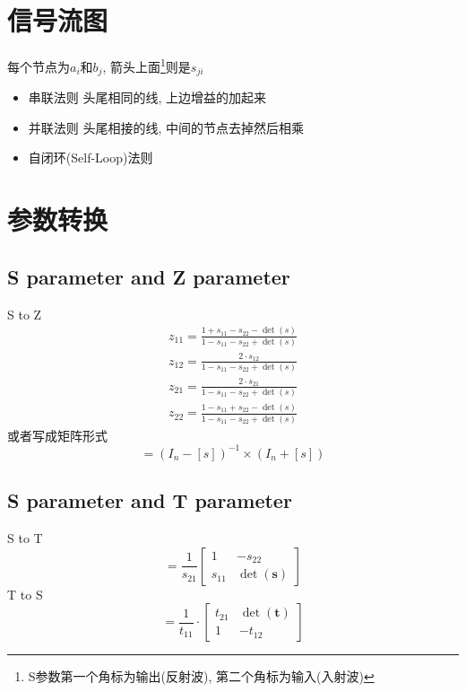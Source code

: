 \documentclass[a4paper]{report}
\begin{document}
\section{信号流图}
每个节点为$a_i$和$b_j$, 箭头上面\footnote{S参数第一个角标为输出(反射波), 第二个角标为输入(入射波)}则是$s_{ji}$
\begin{itemize}
  \item 串联法则 头尾相同的线, 上边增益的加起来
  \item 并联法则 头尾相接的线, 中间的节点去掉然后相乘
  \item 自闭环(Self-Loop)法则 
\end{itemize}

\section{参数转换}

\subsection{S parameter and Z parameter}
S to Z
\begin{align*}
  z_{11}=\frac{1+s_{11}-s_{22}-\det(s)}{1-s_{11}-s_{22}+\det(s)}
  \\ z_{12}=\frac{2\cdot s_{12}}{1-s_{11}-s_{22}+\det(s)}
  \\ z_{21}=\frac{2\cdot s_{21}}{1-s_{11}-s_{22}+\det(s)}
  \\ z_{22}=\frac{1-s_{11}+s_{22}-\det(s)}{1-s_{11}-s_{22}+\det(s)}
\end{align*}
或者写成矩阵形式
\begin{equation}
  [z]=(I_n-[s])^{-1}\times (I_n+[s])
\end{equation}
\subsection{S parameter and T parameter}
S to T
\begin{equation}
  [t]=\frac{1}{s_{21}}\begin{bmatrix}
    1&-s_{22}
    \\ s_{11}&\det(\textbf{s})
  \end{bmatrix}
\end{equation}
T to S
\begin{equation}
  [s]=\frac{1}{t_{11}}\cdot\begin{bmatrix}
    t_{21}&\det(\textbf{t})
    \\ 1 & -t_{12}
  \end{bmatrix}
\end{equation}
\end{document}
